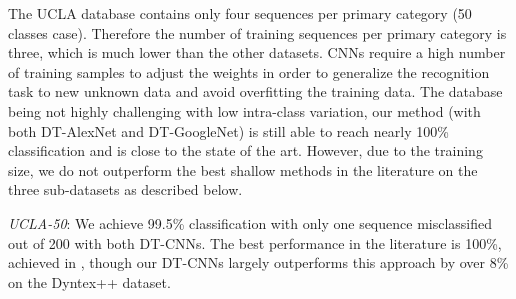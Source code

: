 \documentclass[a4paper,11pt]{article}
\begin{document}
The UCLA database contains only four sequences per primary category (50 classes case). Therefore the number of training sequences per primary category is three, which is much lower than the other datasets.
CNNs require a high number of training samples to adjust the weights in order to generalize the recognition task to new unknown data and avoid overfitting the training data.
The database being not highly challenging with low intra-class variation, our method (with both DT-AlexNet and DT-GoogleNet) is still able to reach nearly 100\% classification and is close to the state of the art.
However, due to the training size, we do not outperform the best shallow methods in the literature on the three sub-datasets as described below.

\textit{UCLA-50}: We achieve 99.5\% classification with only one sequence misclassified out of 200 with both DT-CNNs.
The best performance in the literature is 100\%, achieved in \cite{xu2011dynamic}, though our DT-CNNs largely outperforms this approach by over 8\% on the Dyntex++ dataset.
\end{document}

